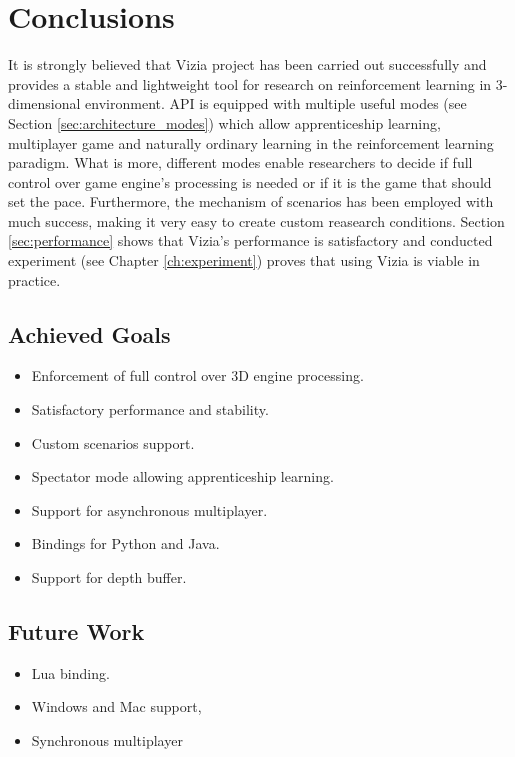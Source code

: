 \chapter{Conclusions}\label{ch:conclusions}
	It is strongly believed that Vizia project has been carried out successfully and provides a stable and lightweight tool for research on reinforcement learning in 3-dimensional environment. API is equipped with multiple useful modes (see Section \ref{sec:architecture_modes}) which allow apprenticeship learning, multiplayer game and naturally ordinary learning in the reinforcement learning paradigm. What is more, different modes enable researchers to decide if full control over game engine's processing is needed or if it is the game that should set the pace. Furthermore, the mechanism of scenarios has been employed with much success, making it very easy to create custom reasearch conditions. Section \ref{sec:performance} shows that Vizia's performance is satisfactory and conducted experiment (see Chapter \ref{ch:experiment}) proves that using Vizia is viable in practice. 

\section{Achieved Goals}
	\begin{itemize}
		\item Enforcement of full control over 3D engine processing.
		\item Satisfactory performance and stability.
		\item Custom scenarios support.
		\item Spectator mode allowing apprenticeship learning.
		\item Support for asynchronous multiplayer.
		\item Bindings for Python and Java.
		\item Support for depth buffer.
	\end{itemize}

\section{Future Work}
	\begin{itemize}
		\item Lua binding.
		\item Windows and Mac support,
		\item Synchronous multiplayer
	\end{itemize}
